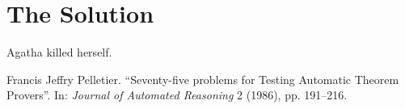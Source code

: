 \documentclass{article}
\begin{document}
\section{The Solution}

\begin{forthel}
  \begin{theorem}
    Agatha killed herself.
  \end{theorem}
\end{forthel}

\begin{thebibliography}{9}
  Francis Jeffry Pelletier.
  ``Seventy-five problems for Testing Automatic Theorem Provers''.
  In: \textit{Journal of Automated Reasoning} 2 (1986),
  pp. 191--216.
\end{thebibliography}
\end{document}
